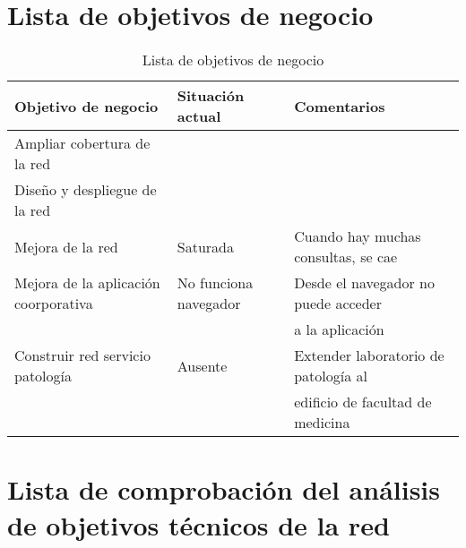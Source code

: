 \section{Lista de objetivos de negocio}

\begin{table}[H]
	\begin{center}
		\begin{tabular}{|l|l|l|}
			\hline 
			Objetivo de negocio & Situación actual & Comentarios \\ 
			\hline \hline
			Ampliar cobertura de la red &  & \\ \hline
			Diseño y despliegue de la red & & \\ \hline
			Mejora de la red & Saturada & Cuando hay muchas consultas, se cae \\ \hline
			Mejora de la aplicación coorporativa & No funciona navegador & Desde el navegador no puede acceder \\
			& &  a la aplicación\\ \hline	
			Construir red servicio patología & Ausente & Extender laboratorio de patología al \\
			& & edificio de facultad de medicina\\ \hline	
		\end{tabular}
		\caption{Lista de objetivos de negocio}
		\label{tabla:tabla3}
	\end{center}
\end{table}

\section{Lista de comprobación del análisis de objetivos técnicos de la red}

